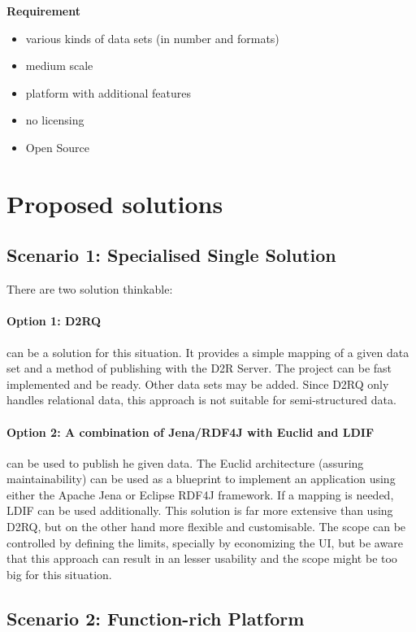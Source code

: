 \textbf{Requirement}
\begin{itemize}
\itemsep0pt
\item various kinds of data sets (in number and formats)
\item medium scale
\item platform with additional features
\item no licensing
\item Open Source
\end{itemize}

\section{Proposed solutions}

\subsection{Scenario 1: Specialised Single Solution}

There are two solution thinkable:

\paragraph{Option 1: D2RQ} can be a solution for this situation. It provides a simple mapping of a given data set and a method of publishing with the D2R Server. The project can be fast implemented and be ready. Other data sets may be added. Since D2RQ only handles relational data, this approach is not suitable for semi-structured data.

\paragraph{Option 2: A combination of Jena/RDF4J with Euclid and LDIF} can be used to publish he given data. The Euclid architecture (assuring maintainability) can be used as a blueprint to implement an application using either the Apache Jena or Eclipse RDF4J framework. If a mapping is needed, LDIF can be used additionally. This solution is far more extensive than using D2RQ, but on the other hand more flexible and customisable. The scope can be controlled by defining the limits, specially by economizing the UI, but be aware that this approach can result in an lesser usability and the scope might be too big for this situation.

\subsection{Scenario 2: Function-rich Platform}

